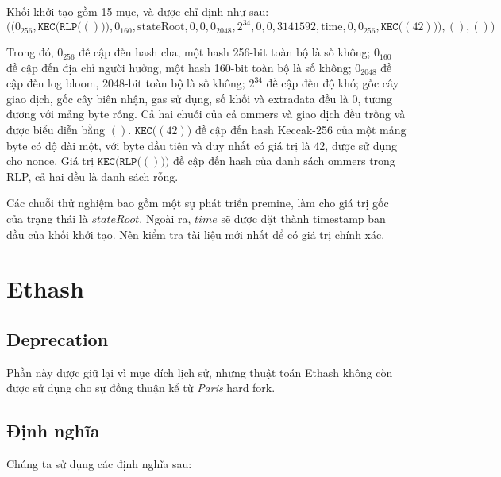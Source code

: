 \documentclass[9pt,oneside]{amsart}
\begin{document}
Khối khởi tạo gồm 15 mục, và được chỉ định như sau:
\begin{equation}
\big( \big( 0_{256}, \mathtt{KEC}\big(\mathtt{RLP}\big( () \big)\big), 0_{160}, \text{stateRoot}, 0, 0, 0_{2048}, 2^{34}, 0, 0, 3141592, \text{time}, 0, 0_{256},  \mathtt{KEC}\big( (42) \big) \big), (), () \big)
\end{equation}

Trong đó, $0_{256}$ đề cập đến hash cha, một hash 256-bit toàn bộ là số không; $0_{160}$ đề cập đến địa chỉ người hưởng, một hash 160-bit toàn bộ là số không; $0_{2048}$ đề cập đến log bloom, 2048-bit toàn bộ là số không; $2^{34}$ đề cập đến độ khó; gốc cây giao dịch, gốc cây biên nhận, gas sử dụng, số khối và extradata đều là $0$, tương đương với mảng byte rỗng. Cả hai chuỗi của cả ommers và giao dịch đều trống và được biểu diễn bằng $()$. $\mathtt{KEC}\big( (42) \big)$ đề cập đến hash Keccak-256 của một mảng byte có độ dài một, với byte đầu tiên và duy nhất có giá trị là 42, được sử dụng cho nonce. Giá trị $\mathtt{KEC}\big(\mathtt{RLP}\big( () \big)\big)$ đề cập đến hash của danh sách ommers trong RLP, cả hai đều là danh sách rỗng.

Các chuỗi thử nghiệm bao gồm một sự phát triển premine, làm cho giá trị gốc của trạng thái là $stateRoot$. Ngoài ra, $time$ sẽ được đặt thành timestamp ban đầu của khối khởi tạo. Nên kiểm tra tài liệu mới nhất để có giá trị chính xác.


\section{Ethash}\label{app:ethash}
\subsection{Deprecation}
Phần này được giữ lại vì mục đích lịch sử, nhưng thuật toán Ethash không còn được sử dụng cho sự đồng thuận kể từ \textit{Paris} hard fork.

\subsection{Định nghĩa}
Chúng ta sử dụng các định nghĩa sau:
\end{document}
